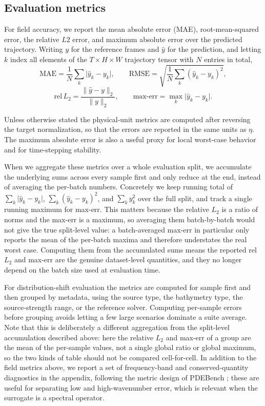 \subsection{Evaluation metrics}
\label{subsec:eval-metrics}

For field accuracy, we report the mean absolute error (MAE), root-mean-squared error, the relative $L2$ error, and maximum absolute error over the predicted trajectory. Writing  $y$ for the reference frames and $\widehat{y}$ for the prediction, and letting $k$ index all elements of the $T \times H \times W$ trajectory tensor with $N$ entries in total,
\[
\mathrm{MAE} = \frac{1}{N}\sum_{k} \lvert \widehat{y}_k - y_k \rvert,
\qquad
\mathrm{RMSE} = \sqrt{\frac{1}{N}\sum_{k} (\widehat{y}_k - y_k)^2},
\]
\[
\mathrm{rel}\,L_2 = \frac{\lVert \widehat{y} - y \rVert_2}{\lVert y \rVert_2},
\qquad
\mathrm{max\text{-}err} = \max_{k} \lvert \widehat{y}_k - y_k \rvert .
\]

Unless otherwise stated the physical-unit metrics are computed after reversing the target normalization, so that the errors are reported in the same units as $\eta$. The maximum absolute error is also a useful proxy for local worst-case behavior and for time-stepping stability.

When we aggregate these metrics over a whole evaluation split, we accumulate the underlying sums across every sample first and only reduce at the end, instead of averaging the per-batch numbers. Concretely we keep running total of $\sum_k \lvert \widehat{y}_k - y_k \rvert$, $\sum_k (\widehat{y}_k - y_k) ^ 2$, and $\sum_k y_k ^ 2$ over the full split, and track a single running maximum for max-err. This matters because the relative $L_2$ is a ratio of norms and the max-err is a maximum, so averaging them batch-by-batch would not give the true split-level value: a batch-averaged max-err in particular only reports the mean of the per-batch maxima and therefore understates the real worst case. Computing them from the accumulated sums means the reported rel\, $L_2$ and max-err are the genuine dataset-level quantities, and they no longer depend on the batch size used at evaluation time.

For distribution-shift evaluation the metrics are computed for sample first and then grouped by metadata, using the source type, the bathymetry type, the source-strength range, or the reference solver. Computing per-sample errors before grouping avoids letting a few large scenarios dominate a suite average. Note that this is deliberately a different aggregation from the split-level accumulation described above: here the relative $L_2$ and max-err of a group are the mean of the per-sample values, not a single global ratio or global maximum, so the two kinds of table should not be compared cell-for-cell. In addition to the field metrics above, we report a set of frequency-band and conserved-quantity diagnostics in the appendix, following the metric design of PDEBench \citep{takamoto2022pdebench}; these are useful for separating low and high-wavenumber error, which is relevant when the surrogate is a spectral operator.

